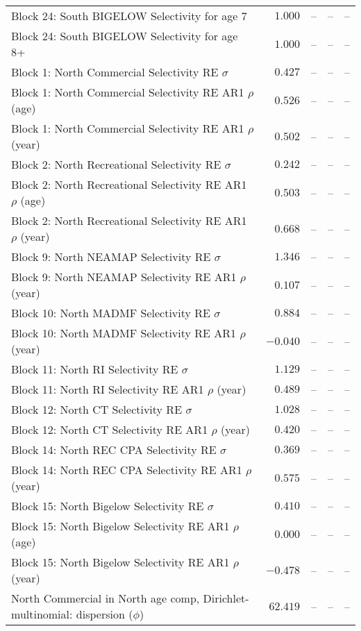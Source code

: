 \documentclass[
]{article}
\begin{document}
\begin{landscape}
\begin{longtable}[t]{lrrrr}
Block 24: South BIGELOW Selectivity for age 7 & $1.000$ & -- & -- & --\\
Block 24: South BIGELOW Selectivity for age 8+ & $1.000$ & -- & -- & --\\
Block 1: North Commercial Selectivity RE $\sigma$ & $0.427$ & -- & -- & --\\
\addlinespace
Block 1: North Commercial Selectivity RE AR1 $\rho$ (age) & $0.526$ & -- & -- & --\\
Block 1: North Commercial Selectivity RE AR1 $\rho$ (year) & $0.502$ & -- & -- & --\\
Block 2: North Recreational Selectivity RE $\sigma$ & $0.242$ & -- & -- & --\\
Block 2: North Recreational Selectivity RE AR1 $\rho$ (age) & $0.503$ & -- & -- & --\\
Block 2: North Recreational Selectivity RE AR1 $\rho$ (year) & $0.668$ & -- & -- & --\\
\addlinespace
Block 9: North NEAMAP Selectivity RE $\sigma$ & $1.346$ & -- & -- & --\\
Block 9: North NEAMAP Selectivity RE AR1 $\rho$ (year) & $0.107$ & -- & -- & --\\
Block 10: North MADMF Selectivity RE $\sigma$ & $0.884$ & -- & -- & --\\
Block 10: North MADMF Selectivity RE AR1 $\rho$ (year) & $-0.040$ & -- & -- & --\\
Block 11: North RI Selectivity RE $\sigma$ & $1.129$ & -- & -- & --\\
\addlinespace
Block 11: North RI Selectivity RE AR1 $\rho$ (year) & $0.489$ & -- & -- & --\\
Block 12: North CT Selectivity RE $\sigma$ & $1.028$ & -- & -- & --\\
Block 12: North CT Selectivity RE AR1 $\rho$ (year) & $0.420$ & -- & -- & --\\
Block 14: North REC CPA Selectivity RE $\sigma$ & $0.369$ & -- & -- & --\\
Block 14: North REC CPA Selectivity RE AR1 $\rho$ (year) & $0.575$ & -- & -- & --\\
\addlinespace
Block 15: North Bigelow Selectivity RE $\sigma$ & $0.410$ & -- & -- & --\\
Block 15: North Bigelow Selectivity RE AR1 $\rho$ (age) & $0.000$ & -- & -- & --\\
Block 15: North Bigelow Selectivity RE AR1 $\rho$ (year) & $-0.478$ & -- & -- & --\\
North Commercial in North age comp, Dirichlet-multinomial: dispersion ($\phi$) & $62.419$ & -- & -- & --\\

\end{longtable}
\end{landscape}
\end{document}
